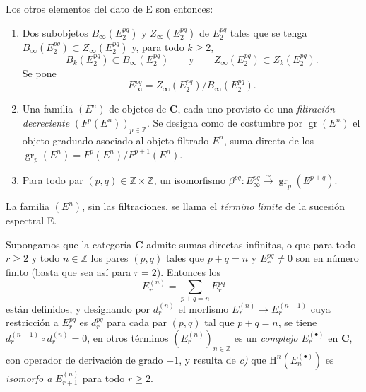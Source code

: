 \begin{env}[11.1.1]
Los otros elementos del dato de E son entonces:
\begin{enumerate}
  \item[$d)$] Dos subobjetos $B_\infty(E_2^{pq})$ y
    $Z_\infty(E_2^{pq})$ de $E_2^{pq}$ tales que se tenga
    $B_\infty(E_2^{pq})\subset Z_\infty(E_2^{pq})$ y, para todo $k\geq2$,
    \[
      B_k(E_2^{pq})\subset B_\infty(E_2^{pq})
      \qquad\text{y}\qquad
      Z_\infty(E_2^{pq})\subset Z_k(E_2^{pq}).
    \]
    Se pone
    \[
    \label{0.11.1.1.3-fr}
      E_\infty^{pq}=Z_\infty(E_2^{pq})/B_\infty(E_2^{pq}).
      \tag{11.1.1.3}
    \]
  \item[$e)$]
    Una familia $(E^n)$ de objetos de $\boldsymbol{C}$, cada uno provisto de una
    \emph{filtración decreciente} $(F^p(E^n))_{p\in\mathbb Z}$. Se designa
    como de costumbre por $\operatorname{gr}(E^n)$ el objeto graduado asociado al
    objeto filtrado $E^n$, suma directa de los
    $\operatorname{gr}_p(E^n)=F^p(E^n)/F^{p+1}(E^n)$.
  \item[$f)$] Para todo par $(p,q)\in\mathbb Z\times\mathbb Z$, un
    isomorfismo
    $\beta^{pq}:E_\infty^{pq}\xrightarrow{\sim}
    \operatorname{gr}_p(E^{p+q})$.
\end{enumerate}

La familia $(E^n)$, sin las filtraciones, se llama el \emph{término límite}
de la sucesión espectral E.

Supongamos que la categoría $\boldsymbol{C}$ admite sumas directas infinitas,
o que para todo $r\geq2$ y todo $n\in\mathbb Z$ los pares $(p,q)$ tales
que $p+q=n$ y $E_r^{pq}\ne0$ son en número finito (basta que sea así
para $r=2$). Entonces los
\[
  E_r^{(n)}=\sum_{p+q=n}E_r^{pq}
\]
están definidos, y designando por $d_r^{(n)}$ el morfismo
$E_r^{(n)}\to E_r^{(n+1)}$ cuya restricción a $E_r^{pq}$ es $d_r^{pq}$
para cada par $(p,q)$ tal que $p+q=n$, se tiene
$d_r^{(n+1)}\circ d_r^{(n)}=0$, en otros términos $(E_r^{(n)})_{n\in\mathbb Z}$
es un \emph{complejo $E_r^{(\bullet)}$} en $\boldsymbol{C}$, con operador de
derivación de grado $+1$, y resulta de \emph{c)} que
$\mathrm H^n(E_n^{(\bullet)})$ es \emph{isomorfo a} $E_{r+1}^{(n)}$ para todo
$r\geq2$.
\end{env}

